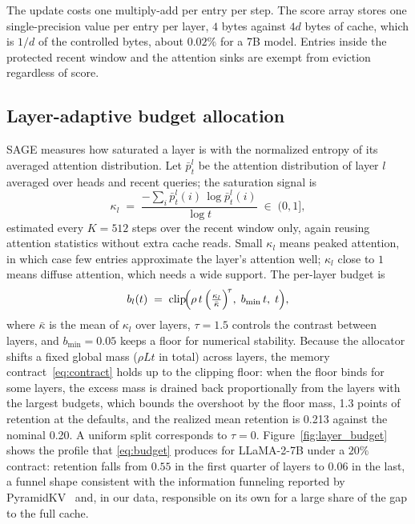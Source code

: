 The update costs one multiply-add per entry per step. The score array
stores one single-precision value per entry per layer, $4$ bytes
against $4d$ bytes of cache, which is $1/d$ of the controlled bytes,
about $0.02\%$ for a 7B model. Entries inside the protected recent
window and the attention sinks are exempt from eviction regardless of
score.

\subsection{Layer-adaptive budget allocation}\label{sec:method_laba}

SAGE measures how saturated a layer is with the normalized entropy of
its averaged attention distribution. Let $\bar{p}^{l}_t$ be the
attention distribution of layer $l$ averaged over heads and recent
queries; the saturation signal is
\begin{equation}\label{eq:kappa}
  \kappa_l \;=\;
  \frac{-\sum_{i} \bar{p}^{l}_t(i)\,\log \bar{p}^{l}_t(i)}
       {\log t}
  \;\in\; (0,1],
\end{equation}
estimated every $K = 512$ steps over the recent window only, again
reusing attention statistics without extra cache reads. Small
$\kappa_l$ means peaked attention, in which case few entries
approximate the layer's attention well; $\kappa_l$ close to $1$ means
diffuse attention, which needs a wide support. The per-layer budget is
\begin{equation}\label{eq:budget}
  b_l(t) \;=\; \operatorname{clip}\!\Bigl(
  \rho\, t\,
  \Bigl(\tfrac{\kappa_l}{\bar{\kappa}}\Bigr)^{\!\tau},
  \; b_{\min}\, t,\; t \Bigr),
\end{equation}
where $\bar{\kappa}$ is the mean of $\kappa_l$ over layers, $\tau = 1.5$
controls the contrast between layers, and $b_{\min} = 0.05$ keeps a
floor for numerical stability. Because the allocator shifts a fixed
global mass ($\rho L t$ in total) across layers, the memory
contract~\eqref{eq:contract} holds up to the clipping floor: when the
floor binds for some layers, the excess mass is drained back
proportionally from the layers with the largest budgets, which bounds
the overshoot by the floor mass, 1.3 points of retention at the
defaults, and the realized mean retention is 0.213 against the nominal
0.20. A uniform split corresponds to $\tau = 0$. Figure~\ref{fig:layer_budget} shows the
profile that \eqref{eq:budget} produces for LLaMA-2-7B under a $20\%$
contract: retention falls from $0.55$ in the first quarter of layers to
$0.06$ in the last, a funnel shape consistent with the information
funneling reported by PyramidKV~\cite{zhang2024pyramidkv} and, in our
data, responsible on its own for a large share of the gap to the full
cache.

